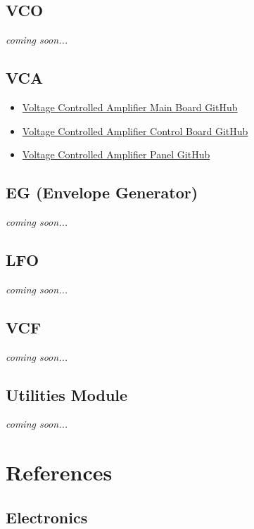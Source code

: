 \documentclass{article}
\begin{document}
\subsection{VCO}
\emph{coming soon...}
\subsection{VCA}
\begin{itemize}
\item \href{https://github.com/joshpanzarella/AYOM-VCA}{Voltage Controlled Amplifier Main Board GitHub}
\item \href{https://github.com/joshpanzarella/AYOM-VCA-Control-Board}{Voltage Controlled Amplifier Control Board GitHub}
\item \href{https://github.com/joshpanzarella/AYOM-VCA-Panel}{Voltage Controlled Amplifier Panel GitHub}
\end{itemize}
\subsection{EG (Envelope Generator)}
\emph{coming soon...}
\subsection{LFO}
\emph{coming soon...}
\subsection{VCF}
\emph{coming soon...}
\subsection{Utilities Module}
\emph{coming soon...}

\section{References}

\subsection{Electronics}
\end{document}
